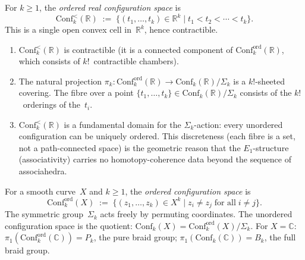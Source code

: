 \begin{definition}
\ClaimStatusProvedHere
\label{def:ordered-real-config}
For $k\ge 1$, the \emph{ordered real configuration space} is
\[
\mathrm{Conf}_k^{<}(\mathbb R)
\;:=\;
\bigl\{(t_1,\dots,t_k)\in\mathbb R^k
\;\big|\;
t_1<t_2<\cdots<t_k\bigr\}.
\]
This is a single open convex cell in~$\mathbb R^k$,
hence contractible.
\end{definition}

\begin{proposition}
\label{prop:ordered-real-config-topology}
\begin{enumerate}[label=\textup{(\roman*)}]
\item $\mathrm{Conf}_k^{<}(\mathbb R)$ is contractible
 (it is a connected component of
 $\mathrm{Conf}_k^{\mathrm{ord}}(\mathbb R)$, which
 consists of $k!$~contractible chambers).
\item The natural projection
 $\pi_k\colon \mathrm{Conf}_k^{\mathrm{ord}}(\mathbb R)
 \to \mathrm{Conf}_k(\mathbb R)/\Sigma_k$
 is a $k!$-sheeted covering. The fibre over a point
 $\{t_1,\dots,t_k\}\in\mathrm{Conf}_k(\mathbb R)/\Sigma_k$
 consists of the $k!$~orderings of the~$t_i$.
\item $\mathrm{Conf}_k^{<}(\mathbb R)$ is a fundamental domain
 for the $\Sigma_k$-action: every unordered configuration
 can be uniquely ordered. This discreteness (each fibre
 is a set, not a path-connected space) is the geometric
 reason that the $E_1$-structure (associativity) carries no
 homotopy-coherence data beyond the sequence of
 associahedra.
\end{enumerate}
\end{proposition}

\begin{definition}
\ClaimStatusProvedHere
\label{def:ordered-hol-config}
For a smooth curve~$X$ and $k\ge 1$, the \emph{ordered
configuration space} is
\[
\mathrm{Conf}_k^{\mathrm{ord}}(X)
\;:=\;
\bigl\{(z_1,\dots,z_k)\in X^k
\;\big|\;
z_i\neq z_j\;\text{for all}\;i\neq j\bigr\}.
\]
The symmetric group~$\Sigma_k$ acts freely by permuting
coordinates. The unordered configuration space is the
quotient:
$\mathrm{Conf}_k(X)
=\mathrm{Conf}_k^{\mathrm{ord}}(X)/\Sigma_k$.
For $X=\mathbb C$:
$\pi_1(\mathrm{Conf}_k^{\mathrm{ord}}(\mathbb C))=P_k$,
the pure braid group;
$\pi_1(\mathrm{Conf}_k(\mathbb C))=B_k$,
the full braid group.
\end{definition}

